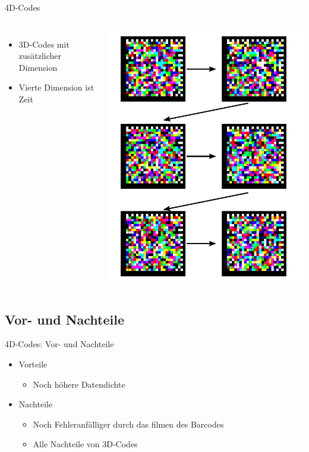 \begin{frame}{4D-Codes}
	\begin{columns}
		\begin{itemize}
		\item 3D-Codes mit zusätzlicher Dimension
		\item Vierte Dimension ist Zeit
		\end{itemize}
		\includegraphics[width=\textwidth]{muzy/4d-concept.pdf}
	\end{columns}
\end{frame}

\subsection{Vor- und Nachteile}
\begin{frame}{4D-Codes: Vor- und Nachteile}
	\begin{itemize}
	\item Vorteile
		\begin{itemize}
		\item Noch höhere Datendichte
		\end{itemize}
	\item Nachteile
		\begin{itemize}
		\item Noch Fehleranfälliger durch das filmen des Barcodes
		\item Alle Nachteile von 3D-Codes
		\end{itemize}
	\end{itemize}
\end{frame}

